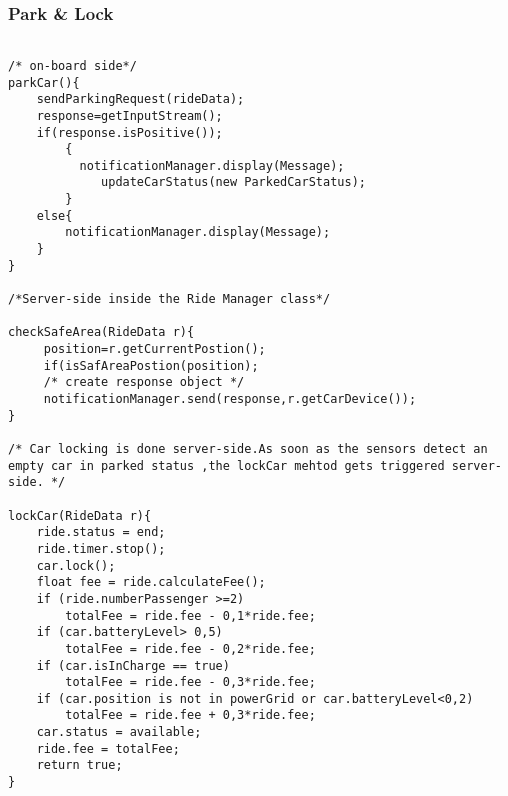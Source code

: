 \subsubsection{Park \& Lock}
\begin{lstlisting}

/* on-board side*/
parkCar(){
	sendParkingRequest(rideData);
	response=getInputStream();
	if(response.isPositive());
		{
		  notificationManager.display(Message);
		  	 updateCarStatus(new ParkedCarStatus);
		}
	else{
		notificationManager.display(Message);
	}
}

/*Server-side inside the Ride Manager class*/

checkSafeArea(RideData r){
	 position=r.getCurrentPostion();
	 if(isSafAreaPostion(position);
	 /* create response object */
	 notificationManager.send(response,r.getCarDevice());
}

/* Car locking is done server-side.As soon as the sensors detect an empty car in parked status ,the lockCar mehtod gets triggered server-side. */

lockCar(RideData r){
	ride.status = end;
	ride.timer.stop();
	car.lock();
	float fee = ride.calculateFee();
	if (ride.numberPassenger >=2)
		totalFee = ride.fee - 0,1*ride.fee;
	if (car.batteryLevel> 0,5)
		totalFee = ride.fee - 0,2*ride.fee;
	if (car.isInCharge == true)
		totalFee = ride.fee - 0,3*ride.fee;
	if (car.position is not in powerGrid or car.batteryLevel<0,2)
		totalFee = ride.fee + 0,3*ride.fee;
	car.status = available;
	ride.fee = totalFee;
	return true;
}

\end{lstlisting}





